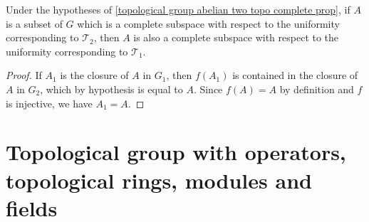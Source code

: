 \begin{corollary}
Under the hypotheses of \cref{topological group abelian two topo complete prop}, if $A$ is a subset of $G$ which is a complete subspace with respect to the uniformity corresponding to $\mathcal{T}_2$, then $A$ is also a complete subspace with respect to the uniformity corresponding to $\mathcal{T}_1$.
\end{corollary}
\begin{proof}
If $A_1$ is the closure of $A$ in $G_1$, then $f(A_1)$ is contained in the closure of $A$ in $G_2$, which by hypothesis is equal to $A$. Since $f(A)=A$ by definition and $f$ is injective, we have $A_1=A$.
\end{proof}
\section{Topological group with operators, topological rings, modules and fields}

